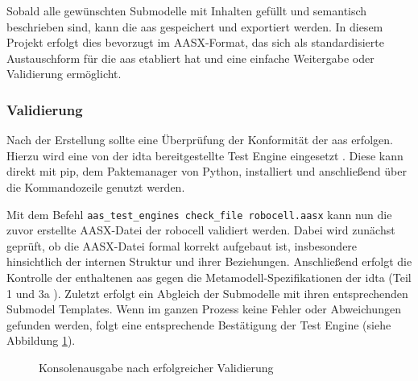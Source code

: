 Sobald alle gewünschten Submodelle mit Inhalten gefüllt und semantisch beschrieben sind, kann die \acs{aas} gespeichert und exportiert werden.
In diesem Projekt erfolgt dies bevorzugt im AASX-Format, das sich als standardisierte Austauschform für die \acs{aas} etabliert hat und eine einfache Weitergabe oder Validierung ermöglicht.




\subsubsection{Validierung}
Nach der Erstellung sollte eine Überprüfung der Konformität der \acs{aas} erfolgen.
Hierzu wird eine von der \acs{idta} bereitgestellte Test Engine eingesetzt \cite{TestEngine}. 
Diese kann direkt mit pip, dem Paktemanager von Python, installiert und anschließend über die Kommandozeile genutzt werden.

Mit dem Befehl \texttt{aas\_test\_engines check\_file robocell.aasx} kann nun die zuvor erstellte AASX-Datei der robocell validiert werden.
Dabei wird zunächst geprüft, ob die AASX-Datei formal korrekt aufgebaut ist, insbesondere hinsichtlich der internen Struktur und ihrer Beziehungen.
Anschließend erfolgt die Kontrolle der enthaltenen \acs{aas} gegen die Metamodell-Spezifikationen der \acs{idta} (Teil 1 \cite{SpezifikationPart1} und 3a \cite{SpezifikationPart3a}).
Zuletzt erfolgt ein Abgleich der Submodelle mit ihren entsprechenden Submodel Templates.
Wenn im ganzen Prozess keine Fehler oder Abweichungen gefunden werden, folgt eine entsprechende Bestätigung der Test Engine (siehe Abbildung \ref{fig:KonsolenausgabeTestEngine}).

\setlength{\fboxsep}{0pt}
\begin{figure}[htbp]
    \centering
    \caption{Konsolenausgabe nach erfolgreicher Validierung}
    \label{fig:KonsolenausgabeTestEngine}
\end{figure}

